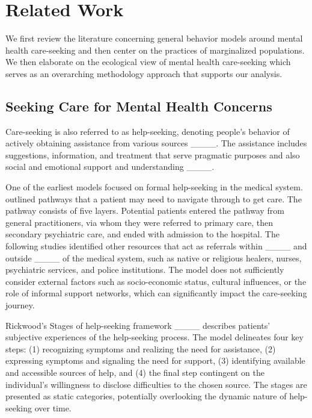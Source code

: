 \section{Related Work}
We first review the literature concerning general behavior models around mental health care-seeking and then center on the practices of marginalized populations. We then elaborate on the ecological view of mental health care-seeking which serves as an overarching methodology approach that supports our analysis. 

\subsection{Seeking Care for Mental Health Concerns} 
Care-seeking is also referred to as help-seeking, denoting people's behavior of actively obtaining assistance from various sources ____. The assistance includes suggestions, information, and treatment that serve pragmatic purposes and also social and emotional support and understanding ____. 

One of the earliest models focused on formal help-seeking in the medical system. \textcite{huxley_mental_1996} outlined pathways that a patient may need to navigate through to get care. The pathway consists of five layers. Potential patients entered the pathway from general practitioners, via whom they were referred to primary care, then secondary psychiatric care, and ended with admission to the hospital. The following studies identified other resources that act as referrals within ____ and outside ____ of the medical system, such as native or religious healers, nurses, psychiatric services, and police institutions.
The model does not sufficiently consider external factors such as socio-economic status, cultural influences, or the role of informal support networks, which can significantly impact the care-seeking journey. 

Rickwood’s Stages of help-seeking framework ____ describes patients' subjective experiences of the help-seeking process. The model delineates four key steps: (1) recognizing symptoms and realizing the need for assistance, (2) expressing symptoms and signaling the need for support, (3) identifying available and accessible sources of help, and (4) the final step contingent on the individual's willingness to disclose difficulties to the chosen source. The stages are presented as static categories, potentially overlooking the dynamic nature of help-seeking over time. 

